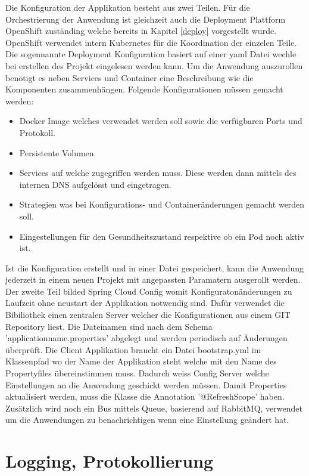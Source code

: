 Die Konfiguration der Applikation besteht aus zwei Teilen. Für die Orchestrierung der Anwendung ist gleichzeit auch die Deployment Plattform OpenShift zuständing welche bereits in Kapitel \ref{deploy} vorgestellt wurde. OpenShift verwendet intern Kubernetes für die Koordination der einzelen Teile. Die sogennannte Deployment Konfiguration basiert auf einer yaml Datei wechle bei erstellen des Projekt eingelesen werden kann. 
Um die Anwendung  auszurollen benötigt es neben Services und Container eine Beschreibung wie die Komponenten zusammenhängen. Folgende Konfigurationen müssen gemacht werden:\newline
\begin{itemize}
	\item Docker Image welches verwendet werden soll sowie die verfügbaren Ports und Protokoll.
	\item Persistente Volumen.
	\item Services auf welche zugegriffen werden muss. Diese werden dann mittels des internen DNS aufgelösst und eingetragen.
	\item Strategien was bei Konfigurations- und Containeränderungen gemacht werden soll.
	\item Eingestellungen für den Gesundheitszustand respektive ob ein Pod noch aktiv ist.
\end{itemize}

Ist die Konfiguration erstellt und in einer Datei gespeichert, kann die Anwendung jederzeit in einem neuen Projekt mit angepassten Paramatern ausgerollt werden.\newline
Der zweite Teil bilded Spring Cloud Config womit Konfiguratonänderungen zu Laufzeit ohne neustart der Applikation notwendig sind. Dafür verwendet die Bibiliothek einen zentralen Server welcher die Konfigurationen aus einem GIT Repository liest. Die Dateinamen sind nach dem Schema 'applicationname.properties' abgelegt und werden periodisch auf Änderungen überprüft. Die Client Applikation braucht ein Datei bootstrap.yml im Klassenpfad wo der Name der Applikation steht welche mit den Name des Propertyfiles übereinstimmen muss. Dadurch weiss Config Server welche Einstellungen an die Anwendung geschickt werden müssen. Damit Properties aktualisiert werden, muss die Klasse die Annotation '@RefreshScope' haben. Zusätzlich wird noch ein Bus mittels Queue, basierend auf RabbitMQ, verwendet um die Anwendungen zu benachrichtigen wenn eine Einstellung geändert hat.

\section{Logging, Protokollierung}


